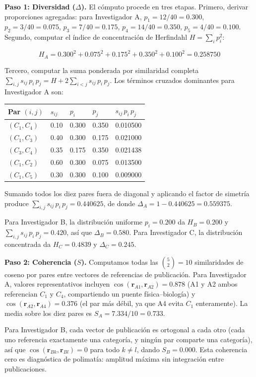 \documentclass[
]{article}
\begin{document}
\textbf{Paso 1: Diversidad (\(\Delta\)).} El cómputo procede en tres
etapas. Primero, derivar proporciones agregadas: para Investigador A,
\(p_1 = 12/40 = 0.300\), \(p_2 = 3/40 = 0.075\), \(p_3 = 7/40 = 0.175\),
\(p_4 = 14/40 = 0.350\), \(p_5 = 4/40 = 0.100\). Segundo, computar el
índice de concentración de Herfindahl \(H = \sum_i p_i^2\):

\[H_A = 0.300^2 + 0.075^2 + 0.175^2 + 0.350^2 + 0.100^2 = 0.258750\]

Tercero, computar la suma ponderada por similaridad completa
\(\sum_{i,j} s_{ij}\,p_i\,p_j = H + 2\sum_{i < j} s_{ij}\,p_i\,p_j\).
Los términos cruzados dominantes para Investigador A son:

\begin{longtable}[]{@{}lllll@{}}
\toprule
Par \((i,j)\) & \(s_{ij}\) & \(p_i\) & \(p_j\) & \(s_{ij}\,p_i\,p_j\) \\
\midrule
\endhead
\((C_1,C_4)\) & 0.10 & 0.300 & 0.350 & 0.010500 \\
\((C_1,C_3)\) & 0.40 & 0.300 & 0.175 & 0.021000 \\
\((C_3,C_4)\) & 0.35 & 0.175 & 0.350 & 0.021438 \\
\((C_1,C_2)\) & 0.60 & 0.300 & 0.075 & 0.013500 \\
\((C_1,C_5)\) & 0.30 & 0.300 & 0.100 & 0.009000 \\
\bottomrule
\end{longtable}

Sumando todos los diez pares fuera de diagonal y aplicando el factor de
simetría produce \(\sum_{i,j} s_{ij}\,p_i\,p_j = 0.440625\), de donde
\(\Delta_A = 1 - 0.440625 = 0.559375\).

Para Investigador B, la distribución uniforme \(p_i = 0.200\) da
\(H_B = 0.200\) y \(\sum_{i,j} s_{ij}\,p_i\,p_j = 0.420\), así que
\(\Delta_B = 0.580\). Para Investigador C, la distribución concentrada
da \(H_C = 0.4839\) y \(\Delta_C = 0.245\).

\textbf{Paso 2: Coherencia (\(S\)).} Computamos todas las
\(\binom{5}{2} = 10\) similaridades de coseno por pares entre vectores
de referencias de publicación. Para Investigador A, valores
representativos incluyen
\(\cos(\mathbf{r}_{A1}, \mathbf{r}_{A2}) = 0.878\) (A1 y A2 ambos
referencian \(C_1\) y \(C_4\), compartiendo un puente física--biología)
y \(\cos(\mathbf{r}_{A2}, \mathbf{r}_{A4}) = 0.376\) (el par más débil,
ya que A4 evita \(C_1\) enteramente). La media sobre los diez pares es
\(S_A = 7.334/10 = 0.733\).

Para Investigador B, cada vector de publicación es ortogonal a cada otro
(cada uno referencia exactamente una categoría, y ningún par comparte
una categoría), así que \(\cos(\mathbf{r}_{Bk}, \mathbf{r}_{Bl}) = 0\)
para todo \(k \neq l\), dando \(S_B = 0.000\). Esta coherencia cero es
diagnóstica de polimatía: amplitud máxima sin integración entre
publicaciones.
\end{document}
